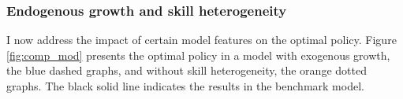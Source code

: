 \subsubsection{Endogenous growth and skill heterogeneity}\label{subsec:xgrnsk}

I now address the impact of certain model features on the optimal policy. 
Figure \ref{fig:comp_mod} presents the optimal policy in a model with exogenous growth, the blue dashed graphs, and without skill heterogeneity, the orange dotted graphs. The black solid line indicates the results in the benchmark model. 

